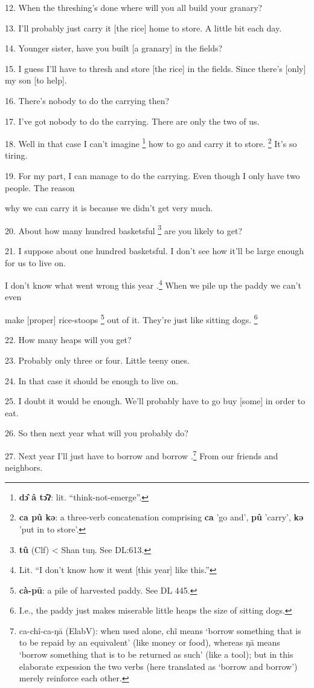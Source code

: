 12. When the threshing's done where will you all build your granary?

13. I'll probably just carry it [the rice] home to store. A little bit each day.

14. Younger sister, have you built [a granary] in the fields?

15. I guess I'll have to thresh and store [the rice] in the fields. Since there's
[only] my son [to help].

16. There's nobody to do the carrying then?

17. I've got nobody to do the carrying. There are only the two of us.

18. Well in that case I can't imagine \footnote{\textbf{dɔ̂ â tɔ̂ʔ}: lit. ``think-not-emerge''.} how to go and carry it to store. \footnote{\textbf{ca pû kə}: a three-verb concatenation comprising \textbf{ca} 'go and', \textbf{pû} 'carry', \textbf{kə} 'put in to store'.}
It's so tiring.

19. For my part, I can manage to do the carrying. Even though I only have two people.
The reason

why we can carry it is because we didn't get very much.

20. About how many hundred basketsful \footnote{\textbf{tû} (Clf) < Shan tuŋ. See DL:613.} are you likely to get?

21. I suppose about one hundred basketsful. I don't see how it'll be large enough
for us to live on.

I don't know what went wrong this year .\footnote{Lit. ``I don't know how it went [this year] like this.''} When we pile up the paddy we can't
even

make [proper] rice-stoops \footnote{\textbf{cà-pū}: a pile of harvested paddy. See DL 445.} out of it. They're just like sitting dogs. \footnote{I.e., the paddy just makes miserable little heaps the size of sitting dogs.}

22. How many heaps will you get?

23. Probably only three or four. Little teeny ones.

24. In that case it should be enough to live on.

25. I doubt it would be enough. We'll probably have to go buy [some] in order to
eat.

26. So then next year what will you probably do?

27. Next year I'll just have to borrow and borrow .\footnote{ca-chî-ca-ŋā (ElabV): when used alone, chî means `borrow something that is to be repaid by  an equivalent' (like money or food), whereas ŋā means `borrow something that is to be returned  as such' (like a tool); but in this elaborate expession the two verbs (here translated as `borrow  and borrow') merely reinforce each other.} From our friends and neighbors.

